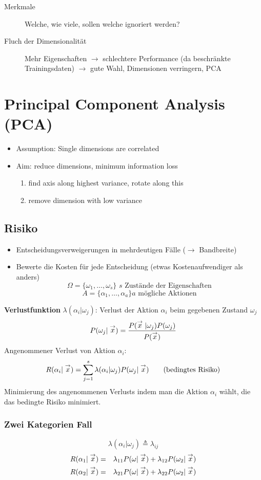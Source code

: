 \begin{description}
	\item[Merkmale] Welche, wie viele, sollen welche ignoriert werden?
	\item[Fluch der Dimensionalität] Mehr Eigenschaften $\to$ schlechtere Performance (da beschränkte Trainingsdaten) $\to$ gute Wahl, Dimensionen verringern, PCA
\end{description}

\section{Principal Component Analysis (PCA)}
\begin{itemize}
	\item Assumption: Single dimensions are correlated
	\item Aim: reduce dimensions, minimum information loss
	\begin{enumerate}
		\item find axis along highest variance, rotate along this
		\item remove dimension with low variance
	\end{enumerate}
\end{itemize}

\subsection{Risiko}

\begin{itemize}
\item Entscheidungsverweigerungen in mehrdeutigen Fälle ($\to$ Bandbreite)
\item Bewerte die Kosten für jede Entscheidung (etwas Kostenaufwendiger als anders) $$\Omega = \{ \omega_1, \dots, \omega_s \} \,\, s \textrm{ Zustände der Eigenschaften}$$ $$A = \{ \alpha_1, \dots, \alpha_a \} a \textrm{ mögliche Aktionen}$$
\end{itemize}

\textbf{Verlustfunktion}
$\lambda(\alpha_i | \omega_j)$: Verlust der Aktion $\alpha_i$ beim gegebenen Zustand $\omega_j$ $$P(\omega_j | \stackrel{\to}{x}) = \frac{P(\stackrel{\to}{x} | \omega_j) P(\omega_j)}{P(\stackrel{\to}{x})}$$
Angenommener Verlust von Aktion $\alpha_i$: $$R(\alpha_i | \stackrel{\to}{x}) = \sum\limits_{j=1}^s \lambda(\alpha_i | \omega_j) P(\omega_j | \stackrel{\to}{x}) \qquad \textrm{(bedingtes Risiko)}$$
Minimierung des angenommenen Verlusts indem man die Aktion $\alpha_i$ wählt, die das bedingte Risiko minimiert.
\subsubsection*{Zwei Kategorien Fall}
$$\lambda(\alpha_i | \omega_j) \triangleq \lambda_{ij}$$
\begin{eqnarray*}
R(\alpha_1 | \stackrel{\to}{x}) &=& \lambda_{11} P(\omega | \stackrel{\to}{x}) + \lambda_{12} P(\omega_2 | \stackrel{\to}{x}) \\
R(\alpha_2 | \stackrel{\to}{x}) &=& \lambda_{21} P(\omega | \stackrel{\to}{x}) + \lambda_{22} P(\omega_2 | \stackrel{\to}{x}) \\
\end{eqnarray*}

